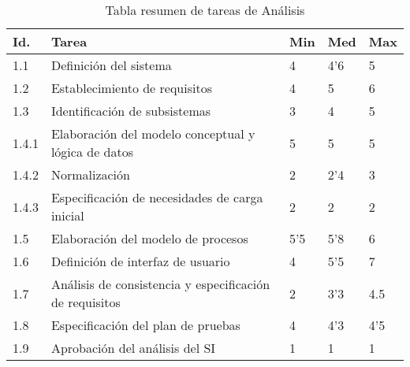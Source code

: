\documentclass[11pt,a4paper,spanish,twoside]{report}
\begin{document}
\begin{table}[!h]
\centering
  \begin{tabular}{|p{0.8cm}||p{8cm}||p{0.75cm}|p{0.75cm}|p{0.75cm}|}
    \hline
    \textbf{Id.} & \textbf{Tarea} & \textbf{Min} &
    \textbf{Med} & \textbf{Max}\\
    \hline \hline
    1.1 & Definición del sistema & 4 & 4'6 & 5\\ 
    \hline
    1.2 & Establecimiento de requisitos & 4 & 5 & 6\\
    \hline
    1.3 & Identificación de subsistemas & 3 & 4 & 5\\
    \hline
    1.4.1 & Elaboración del modelo conceptual y lógica de datos & 5 & 5 & 5\\
    \hline
    1.4.2 & Normalización & 2 & 2'4 & 3 \\
    \hline
    1.4.3 & Especificación de necesidades de carga inicial & 2 & 2 & 2\\
    \hline
    1.5 & Elaboración del modelo de procesos & 5'5 & 5'8 & 6\\
    \hline
    1.6 & Definición de interfaz de usuario & 4 & 5'5 & 7\\
    \hline
    1.7 & Análisis de consistencia y especificación de requisitos & 2 & 3'3 & 4.5\\
    \hline
    1.8 & Especificación del plan de pruebas & 4 & 4'3 & 4'5\\
    \hline
    1.9 & Aprobación del análisis del SI & 1 & 1 & 1\\
    \hline
  \end{tabular}
  \caption{Tabla resumen de tareas de Análisis} \label{Tab:tareas1}
\end{table}
\end{document}

